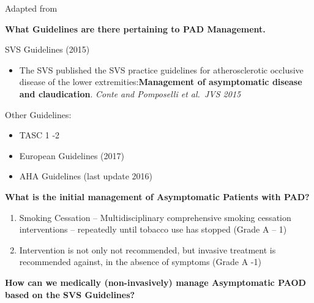 \documentclass[
]{book}
\providecommand{\tightlist}{%
  \setlength{\itemsep}{0pt}\setlength{\parskip}{0pt}}
\begin{document}
Adapted from \citep{stone21VascularLaboratory2019}

\textbf{What Guidelines are there pertaining to PAD Management.}

SVS Guidelines (2015)

\begin{itemize}
\tightlist
\item
  The SVS published the SVS practice guidelines for atherosclerotic
  occlusive disease of the lower extremities:\textbf{Management of
  asymptomatic disease and claudication}. \emph{Conte and Pomposelli et
  al.~JVS 2015} \citep{conteSocietyVascularSurgery2015}
\end{itemize}

Other Guidelines:

\begin{itemize}
\item
  TASC 1 -2
\item
  European Guidelines (2017)
\item
  AHA Guidelines (last update 2016)
\end{itemize}

\textbf{What is the initial management of Asymptomatic Patients with PAD?}

\begin{enumerate}
\def\labelenumi{\arabic{enumi}.}
\tightlist
\item
  Smoking Cessation -- Multidisciplinary comprehensive smoking
  cessation interventions -- repeatedly until tobacco use has stopped
  (Grade A -- 1)
\item
  Intervention is not only not recommended, but invasive treatment is
  recommended against, in the absence of symptoms (Grade A -1)
\end{enumerate}

\textbf{How can we medically (non-invasively) manage Asymptomatic PAOD based
on the SVS Guidelines?}
\end{document}
